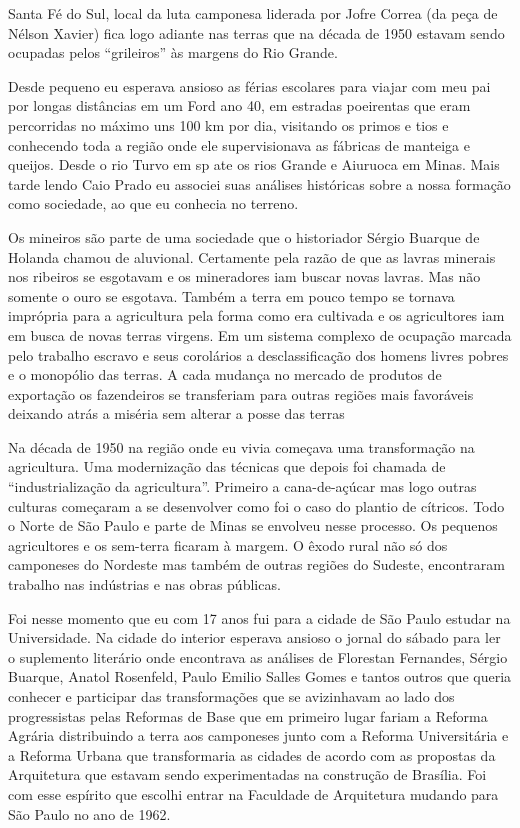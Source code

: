 Santa Fé do Sul, local da luta camponesa liderada por Jofre Correa (da
peça de Nélson Xavier) fica logo adiante nas terras que na década de
1950 estavam sendo ocupadas pelos “grileiros” às margens do Rio Grande.

Desde pequeno eu esperava ansioso as férias escolares para viajar com
meu pai por longas distâncias em um Ford ano 40, em estradas poeirentas
que eram percorridas no máximo uns 100 km por dia, visitando os primos e
tios e conhecendo toda a região onde ele supervisionava as fábricas de
manteiga e queijos. Desde o rio Turvo em {\sc sp} ate os rios Grande e
Aiuruoca em Minas. Mais tarde lendo Caio Prado eu associei suas análises
históricas sobre a nossa formação como sociedade, ao que eu conhecia no
terreno.

Os mineiros são parte de uma sociedade que o historiador Sérgio Buarque
de Holanda chamou de aluvional. Certamente pela razão de que as lavras
minerais nos ribeiros se esgotavam e os mineradores iam buscar novas
lavras. Mas não somente o ouro se esgotava. Também a terra em pouco
tempo se tornava imprópria para a agricultura pela forma como era
cultivada e os agricultores iam em busca de novas terras virgens. Em um
sistema complexo de ocupação marcada pelo trabalho escravo e seus
corolários a desclassificação dos homens livres pobres e o monopólio das
terras. A cada mudança no mercado de produtos de exportação os
fazendeiros se transferiam para outras regiões mais favoráveis deixando
atrás a miséria sem alterar a posse das terras

Na década de 1950 na região onde eu vivia começava uma transformação na
agricultura. Uma modernização das técnicas que depois foi chamada de
“industrialização da agricultura”. Primeiro a cana-de-açúcar mas logo
outras culturas começaram a se desenvolver como foi o caso do plantio de
cítricos. Todo o Norte de São Paulo e parte de Minas se envolveu nesse
processo. Os pequenos agricultores e os sem-terra ficaram à margem. O
êxodo rural não só dos camponeses do Nordeste mas também de outras
regiões do Sudeste, encontraram trabalho nas indústrias e nas obras
públicas.

Foi nesse momento que eu com 17 anos fui para a cidade de São Paulo
estudar na Universidade. Na cidade do interior esperava ansioso o jornal
do sábado para ler o suplemento literário onde encontrava as análises de
Florestan Fernandes, Sérgio Buarque, Anatol Rosenfeld, Paulo Emilio
Salles Gomes e tantos outros que queria conhecer e participar das
transformações que se avizinhavam ao lado dos progressistas pelas
Reformas de Base que em primeiro lugar fariam a Reforma Agrária
distribuindo a terra aos camponeses junto com a Reforma Universitária e
a Reforma Urbana que transformaria as cidades de acordo com as propostas
da Arquitetura que estavam sendo experimentadas na construção de
Brasília. Foi com esse espírito que escolhi entrar na Faculdade de
Arquitetura mudando para São Paulo no ano de 1962.

